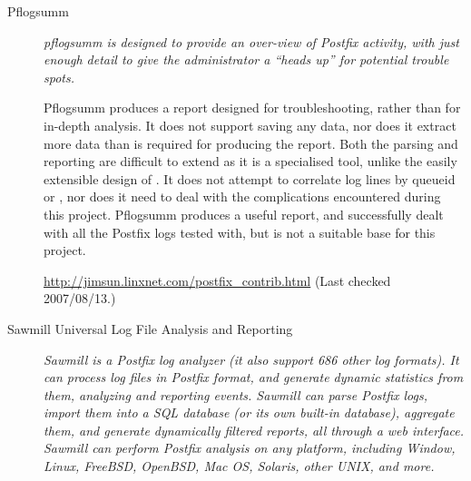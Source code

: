 \documentclass[a4paper,12pt,draft]{article}
\newcommand{\parsername}{\PLP{}}
\begin{document}
\begin{description}

    \item [Pflogsumm] \textit{pflogsumm is designed to provide an over-view
        of Postfix activity, with just enough detail to give the
        administrator a ``heads up'' for potential trouble spots.\/}

        Pflogsumm produces a report designed for troubleshooting, rather
        than for in-depth analysis.  It does not support saving any data,
        nor does it extract more data than is required for producing the
        report.  Both the parsing and reporting are difficult to extend as
        it is a specialised tool, unlike the easily extensible design of
        \parsername{}.  It does not attempt to correlate log lines by
        queueid or \pid{}, nor does it need to deal with the complications
        encountered during this project.  Pflogsumm produces a useful
        report, and successfully dealt with all the Postfix logs tested
        with, but is not a suitable base for this project.

        \url{http://jimsun.linxnet.com/postfix_contrib.html} \newline (Last
        checked 2007/08/13.)

    \item [Sawmill Universal Log File Analysis and Reporting] \textit{
        Sawmill is a \newline Postfix log analyzer (it also support 686
        other log formats).  It can process log files in Postfix format,
        and generate dynamic statistics from them, analyzing and reporting
        events.  Sawmill can parse Postfix logs, import them into a SQL
        database (or its own built-in database), aggregate them, and
        generate dynamically filtered reports, all through a web interface.
        Sawmill can perform Postfix analysis on any platform, including
        Window, Linux, FreeBSD, OpenBSD, Mac OS, Solaris, other UNIX, and
        more.\/}


\end{description}
\end{document}
